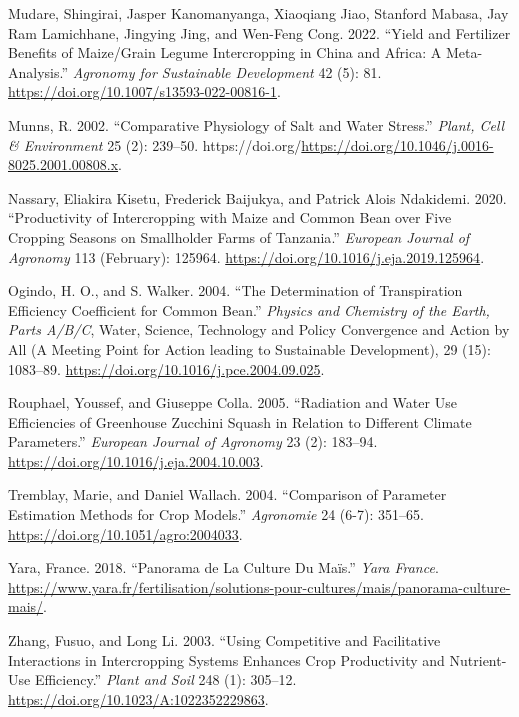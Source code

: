 \documentclass[
]{article}
\newlength{\cslhangindent}
\newenvironment{CSLReferences}[2] %
 {\begin{list}{}{%
  \setlength{\itemindent}{0pt}
  \setlength{\leftmargin}{0pt}
  \setlength{\parsep}{0pt}
  \ifodd #1
   \setlength{\leftmargin}{\cslhangindent}
   \setlength{\itemindent}{-1\cslhangindent}
  \fi
  \setlength{\itemsep}{#2\baselineskip}}}
 {\end{list}}
\begin{document}
\begin{CSLReferences}{1}{0}
Mudare, Shingirai, Jasper Kanomanyanga, Xiaoqiang Jiao, Stanford Mabasa,
Jay Ram Lamichhane, Jingying Jing, and Wen-Feng Cong. 2022. {``Yield and
Fertilizer Benefits of Maize/Grain Legume Intercropping in {China} and
{Africa}: {A} Meta-Analysis.''} \emph{Agronomy for Sustainable
Development} 42 (5): 81.
\url{https://doi.org/10.1007/s13593-022-00816-1}.

Munns, R. 2002. {``Comparative Physiology of Salt and Water Stress.''}
\emph{Plant, Cell \& Environment} 25 (2): 239--50.
https://doi.org/\url{https://doi.org/10.1046/j.0016-8025.2001.00808.x}.

Nassary, Eliakira Kisetu, Frederick Baijukya, and Patrick Alois
Ndakidemi. 2020. {``Productivity of Intercropping with Maize and Common
Bean over Five Cropping Seasons on Smallholder Farms of {Tanzania}.''}
\emph{European Journal of Agronomy} 113 (February): 125964.
\url{https://doi.org/10.1016/j.eja.2019.125964}.

Ogindo, H. O., and S. Walker. 2004. {``The Determination of
Transpiration Efficiency Coefficient for Common Bean.''} \emph{Physics
and Chemistry of the Earth, Parts A/B/C}, Water, {Science}, {Technology}
and {Policy} {Convergence} and {Action} by {All} ({A} {Meeting} {Point}
for {Action} leading to {Sustainable} {Development}), 29 (15): 1083--89.
\url{https://doi.org/10.1016/j.pce.2004.09.025}.

Rouphael, Youssef, and Giuseppe Colla. 2005. {``Radiation and Water Use
Efficiencies of Greenhouse Zucchini Squash in Relation to Different
Climate Parameters.''} \emph{European Journal of Agronomy} 23 (2):
183--94. \url{https://doi.org/10.1016/j.eja.2004.10.003}.

Tremblay, Marie, and Daniel Wallach. 2004. {``Comparison of Parameter
Estimation Methods for Crop Models.''} \emph{Agronomie} 24 (6-7):
351--65. \url{https://doi.org/10.1051/agro:2004033}.

Yara, France. 2018. {``Panorama de La Culture Du Maïs.''} \emph{Yara
France}.
\url{https://www.yara.fr/fertilisation/solutions-pour-cultures/mais/panorama-culture-mais/}.

Zhang, Fusuo, and Long Li. 2003. {``Using Competitive and Facilitative
Interactions in Intercropping Systems Enhances Crop Productivity and
Nutrient-Use Efficiency.''} \emph{Plant and Soil} 248 (1): 305--12.
\url{https://doi.org/10.1023/A:1022352229863}.

\end{CSLReferences}
\end{document}
